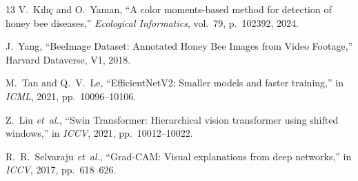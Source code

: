 \documentclass[conference]{IEEEtran}
\begin{document}
\begin{thebibliography}{13}
V.~Kılıç and O.~Yaman, ``A color moments-based method for detection of honey bee diseases,'' \emph{Ecological Informatics}, vol.~79, p.~102392, 2024.

J.~Yang, ``BeeImage Dataset: Annotated Honey Bee Images from Video Footage,'' Harvard Dataverse, V1, 2018.

M.~Tan and Q.~V.~Le, ``EfficientNetV2: Smaller models and faster training,'' in \emph{ICML}, 2021, pp.~10096--10106.

Z.~Liu \emph{et~al.}, ``Swin Transformer: Hierarchical vision transformer using shifted windows,'' in \emph{ICCV}, 2021, pp.~10012--10022.

R.~R.~Selvaraju \emph{et~al.}, ``Grad-CAM: Visual explanations from deep networks,'' in \emph{ICCV}, 2017, pp.~618--626.

\end{thebibliography}
\end{document}
